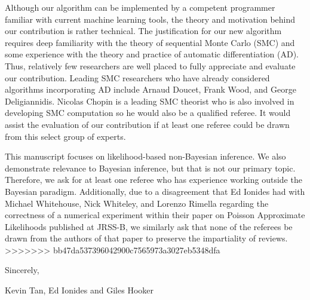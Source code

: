 \documentclass[11pt]{article}
\begin{document}
Although our algorithm can be implemented by a competent programmer familiar with current machine learning tools, the theory and motivation behind our contribution is rather technical. The justification for our new algorithm requires deep familiarity with the theory of sequential Monte Carlo (SMC) and some experience with the theory and practice of automatic differentiation (AD). Thus, relatively few researchers are well placed to fully appreciate and evaluate our contribution. Leading SMC researchers who have already considered algorithms incorporating AD include Arnaud Doucet, Frank Wood, and George Deligiannidis. Nicolas Chopin is a leading SMC theorist who is also involved in developing SMC computation so he would also be a qualified referee. It would assist the evaluation of our contribution if at least one referee could be drawn from this select group of experts.

This manuscript focuses on likelihood-based non-Bayesian inference. We also demonstrate relevance to Bayesian inference, but that is not our primary topic. Therefore, we ask for at least one referee who has experience working outside the Bayesian paradigm. Additionally, due to a disagreement that Ed Ionides had with Michael Whitehouse, Nick Whiteley, and Lorenzo Rimella regarding the correctness of a numerical experiment within their paper on Poisson Approximate Likelihoods published at JRSS-B, we similarly ask that none of the referees be drawn from the authors of that paper to preserve the impartiality of reviews.
>>>>>>> bb47da537396042900c7565973a3027eb5348dfa

\vspace{3ex}

\noindent Sincerely,

\noindent Kevin Tan, Ed Ionides and Giles Hooker
\end{document}
